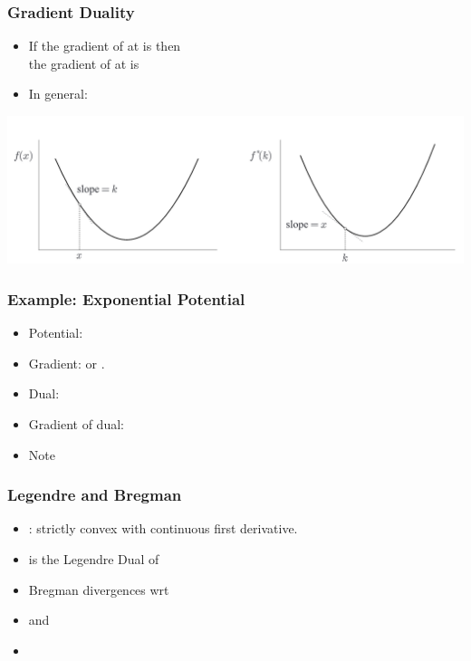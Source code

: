 \documentclass{beamer}
\begin{document}
\begin{frame}
  \frametitle{Gradient Duality}
  \begin{itemize}
  \item
    If the gradient of  at  is  then\\
    the gradient of  at  is 
    \item In general:
  \end{itemize}
  \includegraphics[width=\textwidth]{figures/SlopeDuality.png}
\end{frame}

\begin{frame}
  \frametitle{Example: Exponential Potential}
  \begin{itemize}
  \item Potential: 
  \item Gradient:  or .
  \item Dual:  
  \item Gradient of dual:  
  \item Note 
   \end{itemize}
 \end{frame}

\begin{frame}
  \frametitle{Legendre and Bregman}
  \begin{itemize}
  \item
    : strictly convex with continuous first derivative.
  \item {} is the Legendre Dual of 
  \item {} Bregman divergences wrt 
  \item {} and 
  \item {}
  \end{itemize}
\end{frame}
\end{document}
